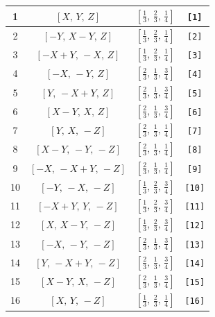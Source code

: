 \documentclass[fleqn,8pt]{jsarticle}
\begin{document}
\begin{longtable}{cccc}
1 & $\left[ X,\, Y,\, Z \right]$ & $\left[ \frac{1}{3},\, \frac{2}{3},\, \frac{1}{4} \right]$ & {\tt [1]} \\ \hline
2 & $\left[ - Y,\, X - Y,\, Z \right]$ & $\left[ \frac{1}{3},\, \frac{2}{3},\, \frac{1}{4} \right]$ & {\tt [2]} \\ \hline
3 & $\left[ - X + Y,\, - X,\, Z \right]$ & $\left[ \frac{1}{3},\, \frac{2}{3},\, \frac{1}{4} \right]$ & {\tt [3]} \\ \hline
4 & $\left[ - X,\, - Y,\, Z \right]$ & $\left[ \frac{2}{3},\, \frac{1}{3},\, \frac{3}{4} \right]$ & {\tt [4]} \\ \hline
5 & $\left[ Y,\, - X + Y,\, Z \right]$ & $\left[ \frac{2}{3},\, \frac{1}{3},\, \frac{3}{4} \right]$ & {\tt [5]} \\ \hline
6 & $\left[ X - Y,\, X,\, Z \right]$ & $\left[ \frac{2}{3},\, \frac{1}{3},\, \frac{3}{4} \right]$ & {\tt [6]} \\ \hline
7 & $\left[ Y,\, X,\, - Z \right]$ & $\left[ \frac{2}{3},\, \frac{1}{3},\, \frac{1}{4} \right]$ & {\tt [7]} \\ \hline
8 & $\left[ X - Y,\, - Y,\, - Z \right]$ & $\left[ \frac{2}{3},\, \frac{1}{3},\, \frac{1}{4} \right]$ & {\tt [8]} \\ \hline
9 & $\left[ - X,\, - X + Y,\, - Z \right]$ & $\left[ \frac{2}{3},\, \frac{1}{3},\, \frac{1}{4} \right]$ & {\tt [9]} \\ \hline
10 & $\left[ - Y,\, - X,\, - Z \right]$ & $\left[ \frac{1}{3},\, \frac{2}{3},\, \frac{3}{4} \right]$ & {\tt [10]} \\ \hline
11 & $\left[ - X + Y,\, Y,\, - Z \right]$ & $\left[ \frac{1}{3},\, \frac{2}{3},\, \frac{3}{4} \right]$ & {\tt [11]} \\ \hline
12 & $\left[ X,\, X - Y,\, - Z \right]$ & $\left[ \frac{1}{3},\, \frac{2}{3},\, \frac{3}{4} \right]$ & {\tt [12]} \\ \hline
13 & $\left[ - X,\, - Y,\, - Z \right]$ & $\left[ \frac{2}{3},\, \frac{1}{3},\, \frac{3}{4} \right]$ & {\tt [13]} \\ \hline
14 & $\left[ Y,\, - X + Y,\, - Z \right]$ & $\left[ \frac{2}{3},\, \frac{1}{3},\, \frac{3}{4} \right]$ & {\tt [14]} \\ \hline
15 & $\left[ X - Y,\, X,\, - Z \right]$ & $\left[ \frac{2}{3},\, \frac{1}{3},\, \frac{3}{4} \right]$ & {\tt [15]} \\ \hline
16 & $\left[ X,\, Y,\, - Z \right]$ & $\left[ \frac{1}{3},\, \frac{2}{3},\, \frac{1}{4} \right]$ & {\tt [16]} \\ \hline

\end{longtable}
\end{document}
